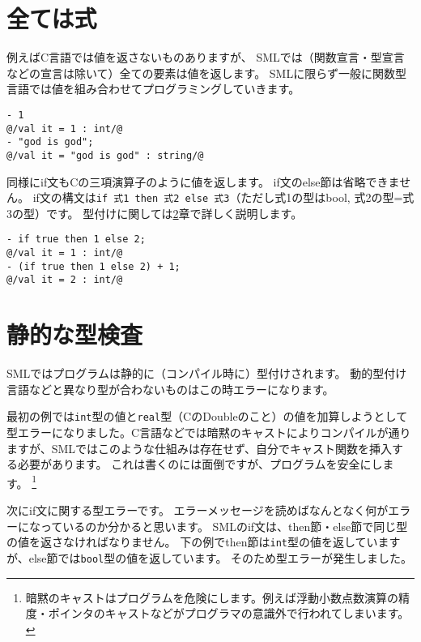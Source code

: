 \documentclass[11pt,a4paper]{article}
\begin{document}
\section{全ては式}

例えばC言語では値を返さないものありますが、
SMLでは（関数宣言・型宣言などの宣言は除いて）全ての要素は値を返します。
SMLに限らず一般に関数型言語では値を組み合わせてプログラミングしていきます。

\begin{lstlisting}[caption=全ては値！,label=code:values]
- 1
@/val it = 1 : int/@
- "god is god";
@/val it = "god is god" : string/@
\end{lstlisting}

同様にif文もCの三項演算子のように値を返します。
if文のelse節は省略できません。
if文の構文は\lstinline{if 式1 then 式2 else 式3}（ただし式1の型はbool, 式2の型=式3の型）です。
型付けに関しては\ref{sec:static-typing}章で詳しく説明します。

\begin{lstlisting}[caption=if文は値,label=doce:if-statement]
- if true then 1 else 2;
@/val it = 1 : int/@
- (if true then 1 else 2) + 1;
@/val it = 2 : int/@
\end{lstlisting}



\section{静的な型検査}
\label{sec:static-typing}

SMLではプログラムは静的に（コンパイル時に）型付けされます。
動的型付け言語などと異なり型が合わないものはこの時エラーになります。

最初の例では\lstinline{int}型の値と\lstinline{real}型（CのDoubleのこと）の値を加算しようとして型エラーになりました。C言語などでは暗黙のキャストによりコンパイルが通りますが、SMLではこのような仕組みは存在せず、自分でキャスト関数を挿入する必要があります。
これは書くのには面倒ですが、プログラムを安全にします。
\footnote{暗黙のキャストはプログラムを危険にします。例えば浮動小数点数演算の精度・ポインタのキャストなどがプログラマの意識外で行われてしまいます。}

次にif文に関する型エラーです。
エラーメッセージを読めばなんとなく何がエラーになっているのか分かると思います。
SMLのif文は、then節・else節で同じ型の値を返さなければなりません。
下の例でthen節は\lstinline{int}型の値を返していますが、else節では\lstinline{bool}型の値を返しています。
そのため型エラーが発生しました。
\end{document}
